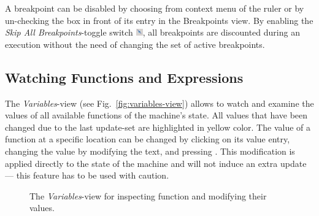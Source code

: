 \documentclass[10pt,oneside,a4paper]{article}
\begin{document}
A breakpoint can be disabled by choosing  from context menu of the ruler or by un-checking the box in front of its entry in the Breakpoints view. By enabling the \emph{Skip All Breakpoints}-toggle switch \includegraphics[height=0.8em]{images/skip-all-breakpoints.png}, all breakpoints are discounted during an execution without the need of changing the set of active breakpoints.

\subsection{Watching Functions and Expressions}
The \emph{Variables}-view (see Fig.~\ref{fig:variables-view}) allows to watch and examine the values of all available functions of the machine's state. All values that have been changed due to the last update-set are highlighted in yellow color. The value of a function at a specific location can be changed by clicking on its value entry, changing the value by modifying the text, and pressing \keys{\enter}. This modification is applied directly to the state of the machine and will not induce an extra update --- this feature has to be used with caution.

\begin{figure}[h]
\centering
	\quad
\caption{The \emph{Variables}-view for inspecting function and modifying their values.}
\label{fig:collection-variables-view}
\end{figure}
\end{document}
